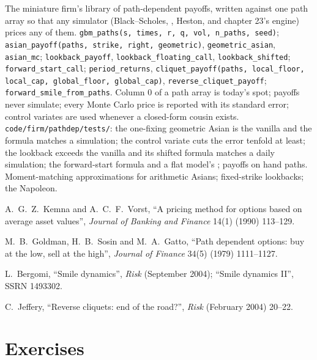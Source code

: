 \begin{build}
 The miniature firm's library of path-dependent payoffs, written against one path array so that any
simulator (Black--Scholes, , Heston, and chapter 23's engine) prices any of them.
 \texttt{gbm\_paths(s, times, r, q, vol, n\_paths, seed)}; \texttt{asian\_payoff(paths, strike, right,
geometric)}, \texttt{geometric\_asian}, \texttt{asian\_mc}; \texttt{lookback\_payoff}, \texttt{lookback\_floating\_call},
\texttt{lookback\_shifted}; \texttt{forward\_start\_call}; \texttt{period\_returns}, \texttt{cliquet\_payoff(paths,
local\_floor, local\_cap, global\_floor, global\_cap)}, \texttt{reverse\_cliquet\_payoff}; \texttt{forward\_smile\_from\_paths}.
 Column 0 of a path array is today's spot; payoffs never simulate; every Monte Carlo price is reported with its
standard error; control variates are used whenever a closed-form cousin exists.
 \texttt{code/firm/pathdep/tests/}: the one-fixing geometric Asian is the vanilla and the formula
matches a simulation; the control variate cuts the error tenfold at least; the lookback exceeds the vanilla and its shifted
formula matches a daily simulation; the forward-start formula and a flat model's ;  payoffs on hand
paths.
 Moment-matching approximations for arithmetic Asians; fixed-strike lookbacks; the Napoleon.
\end{build}

\begin{omsources}
\item A.~G.~Z.~Kemna and A.~C.~F.~Vorst, ``A pricing method for options based on average asset values'', \emph{Journal of
Banking and Finance} 14(1) (1990) 113--129.
\item M.~B.~Goldman, H.~B.~Sosin and M.~A.~Gatto, ``Path dependent options: buy at the low, sell at the high'',
\emph{Journal of Finance} 34(5) (1979) 1111--1127.
\item L.~Bergomi, ``Smile dynamics'', \emph{Risk} (September 2004); ``Smile dynamics II'', SSRN 1493302.
\item C.~Jeffery, ``Reverse cliquets: end of the road?'', \emph{Risk} (February 2004) 20--22.
\end{omsources}

\section{Exercises}

